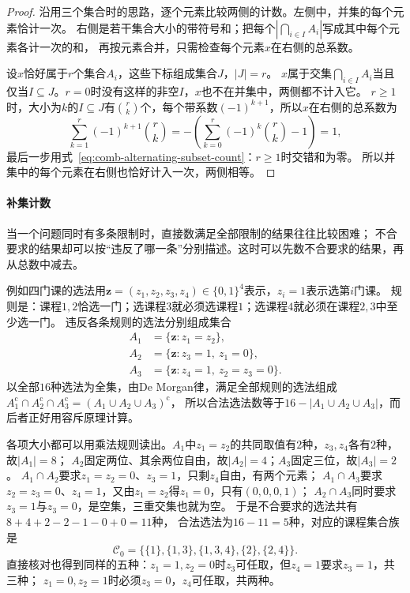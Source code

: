 \begin{proof}
沿用三个集合时的思路，逐个元素比较两侧的计数。左侧中，并集的每个元素恰计一次。
右侧是若干集合大小的带符号和；把每个$|\bigcap_{i\in I}A_i|$写成其中每个元素各计一次的和，
再按元素合并，只需检查每个元素$x$在右侧的总系数。

设$x$恰好属于$r$个集合$A_i$，这些下标组成集合$J$，$|J|=r$。
$x$属于交集$\bigcap_{i\in I}A_i$当且仅当$I\subseteq J$。$r=0$时没有这样的非空$I$，$x$也不在并集中，两侧都不计入它。
$r\geq1$时，大小为$k$的$I\subseteq J$有$\binom rk$个，每个带系数$(-1)^{k+1}$，所以$x$在右侧的总系数为
\[
 \sum_{k=1}^r(-1)^{k+1}\binom rk
 =-\left(\sum_{k=0}^r(-1)^k\binom rk-1\right)=1,
\]
最后一步用式~\eqref{eq:comb-alternating-subset-count}：$r\geq1$时交错和为零。
所以并集中的每个元素在右侧也恰好计入一次，两侧相等。
\end{proof}

\paragraph{补集计数}

当一个问题同时有多条限制时，直接数满足全部限制的结果往往比较困难；
不合要求的结果却可以按“违反了哪一条”分别描述。这时可以先数不合要求的结果，再从总数中减去。

例如四门课的选法用$\bm z=(z_1,z_2,z_3,z_4)\in\{0,1\}^4$表示，$z_i=1$表示选第$i$门课。
规则是：课程$1,2$恰选一门；选课程$3$就必须选课程$1$；选课程$4$就必须在课程$2,3$中至少选一门。
违反各条规则的选法分别组成集合
\[
 \begin{aligned}
 A_1&=\{\bm z:z_1=z_2\},\\
 A_2&=\{\bm z:z_3=1,\ z_1=0\},\\
 A_3&=\{\bm z:z_4=1,\ z_2=z_3=0\}.
 \end{aligned}
\]
以全部$16$种选法为全集，由De Morgan律，满足全部规则的选法组成
$A_1^{\mathrm c}\cap A_2^{\mathrm c}\cap A_3^{\mathrm c}=(A_1\cup A_2\cup A_3)^{\mathrm c}$，
所以合法选法数等于$16-|A_1\cup A_2\cup A_3|$，而后者正好用容斥原理计算。

各项大小都可以用乘法规则读出。$A_1$中$z_1=z_2$的共同取值有$2$种，$z_3,z_4$各有$2$种，故$|A_1|=8$；
$A_2$固定两位、其余两位自由，故$|A_2|=4$；$A_3$固定三位，故$|A_3|=2$。
$A_1\cap A_2$要求$z_1=z_2=0$、$z_3=1$，只剩$z_4$自由，有两个元素；
$A_1\cap A_3$要求$z_2=z_3=0$、$z_4=1$，又由$z_1=z_2$得$z_1=0$，只有$(0,0,0,1)$；
$A_2\cap A_3$同时要求$z_3=1$与$z_3=0$，是空集，三重交集也就为空。
于是不合要求的选法共有$8+4+2-2-1-0+0=11$种，
合法选法为$16-11=5$种，对应的课程集合族是
\begin{equation}
 \mathcal C_0=\bigl\{\{1\},\{1,3\},\{1,3,4\},\{2\},\{2,4\}\bigr\}.
 \label{eq:comb-running-feasible-family}
\end{equation}
直接核对也得到同样的五种：$z_1=1,z_2=0$时$z_3$可任取，但$z_4=1$要求$z_3=1$，共三种；
$z_1=0,z_2=1$时必须$z_3=0$，$z_4$可任取，共两种。

